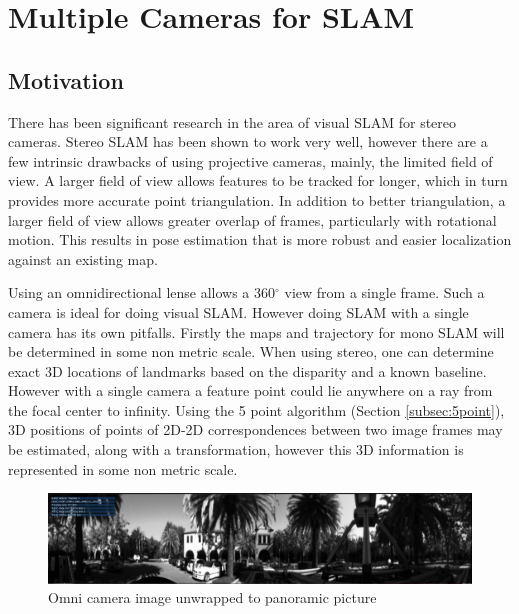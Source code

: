 \chapter{Multiple Cameras for SLAM}
\label{chapter:MultiCamSLAM}

\section{Motivation}

There has been significant research in the area of visual SLAM for stereo \\ cameras\cite{mei_09}\cite{paz_08}\cite{rslam}\cite{particle_slam}\cite{strasdat}.  Stereo SLAM has been shown to work very well, however there are a few intrinsic drawbacks of using projective cameras, mainly, the limited field of view.  A larger field of view allows features to be tracked for longer, which in turn provides more accurate point triangulation.  In addition to better triangulation, a larger field of view allows greater overlap of frames, particularly with rotational motion.  This results in pose estimation that is more robust and easier localization against an existing map. %

Using an omnidirectional lense allows a 360$^{\circ}$ view from a single frame.  Such a camera is ideal for doing visual SLAM.  However doing SLAM with a single camera has its own pitfalls.  Firstly the maps and trajectory for mono SLAM will be determined in some non metric scale.  When using stereo, one can determine exact 3D locations of landmarks based on the disparity and a known baseline.  However with a single camera a feature point could lie anywhere on a ray from the focal center to infinity.  Using the 5 point algorithm (Section \ref{subsec:5point}), 3D positions of points of 2D-2D correspondences between two image frames may be estimated, along with a transformation, however this 3D information is represented in some non metric scale.

\begin{figure}[h!]
  \centering
    \includegraphics[width=1.0\textwidth]{chapters/images/unwrapped}
    \caption{Omni camera image unwrapped to panoramic picture}
  \label{fig:unwrapped}
\end{figure}

